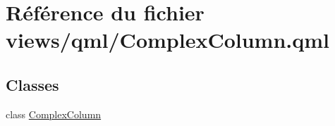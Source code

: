 \hypertarget{ComplexColumn_8qml}{\section{Référence du fichier views/qml/\-Complex\-Column.qml}
\label{ComplexColumn_8qml}
}
\subsection*{Classes}
\begin{DoxyCompactItemize}
\item 
class \hyperlink{classComplexColumn}{Complex\-Column}
\end{DoxyCompactItemize}
